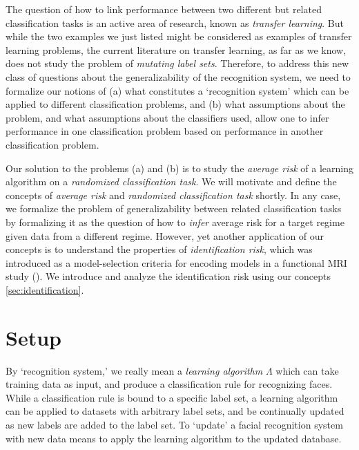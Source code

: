 The question of how to link performance between two different but
related classification tasks is an active area of research, known as
\emph{transfer learning}.  But while the two examples we just listed
might be considered as examples of transfer learning problems, the
current literature on transfer learning, as far as we know, does not
study the problem of \emph{mutating label sets}.  Therefore, to
address this new class of questions about the generalizability of the
recognition system, we need to formalize our notions of (a) what
constitutes a `recognition system' which can be applied to different
classification problems, and (b) what assumptions about the problem,
and what assumptions about the classifiers used, allow one to infer
performance in one classification problem based on performance in
another classification problem.

Our solution to the problems (a) and (b) is to study the \emph{average
  risk} of a learning algorithm on a \emph{randomized classification
  task}.  We will motivate and define the concepts of \emph{average
  risk} and \emph{randomized classification task} shortly.  In any
case, we formalize the problem of generalizability between related
classification tasks by formalizing it as the question of how to
\emph{infer} average risk for a target regime given data from a
different regime.  However, yet another application of our concepts is
to understand the properties of \emph{identification risk}, which was
introduced as a model-selection criteria for encoding models in a
functional MRI study (\cite{Kay2008a}).  We introduce and analyze the
identification risk using our concepts \ref{sec:identification}.

\section{Setup}

By `recognition system,' we really mean a \emph{learning algorithm}
$\Lambda$ which can take training data as input, and produce a
classification rule for recognizing faces.  While a classification
rule is bound to a specific label set, a learning algorithm can be
applied to datasets with arbitrary label sets, and be continually
updated as new labels are added to the label set.  To `update' a
facial recognition system with new data means to apply the learning
algorithm to the updated database.

